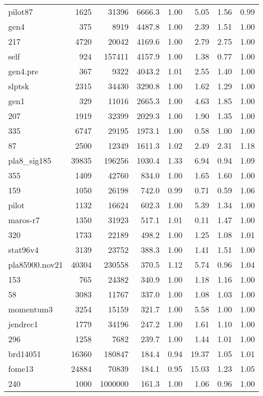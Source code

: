 \documentclass[10pt]{article}
\begin{document}
\begin{longtable}{|l|r|r|r|r|r|r|r|}
pilot87	&	1625	&	31396	&	6666.3	&	1.00	&	5.05	&	1.56	&	0.99	\\
gen4	&	375	&	8919	&	4487.8	&	1.00	&	2.39	&	1.51	&	1.00	\\
217	&	4720	&	20042	&	4169.6	&	1.00	&	2.79	&	2.75	&	1.00	\\
self	&	924	&	157411	&	4157.9	&	1.00	&	1.38	&	0.77	&	1.00	\\
gen4.pre	&	367	&	9322	&	4043.2	&	1.01	&	2.55	&	1.40	&	1.00	\\
slptsk	&	2315	&	34430	&	3290.8	&	1.00	&	1.62	&	1.29	&	1.00	\\
gen1	&	329	&	11016	&	2665.3	&	1.00	&	4.63	&	1.85	&	1.00	\\
207	&	1919	&	32399	&	2029.3	&	1.00	&	1.90	&	1.35	&	1.00	\\
335	&	6747	&	29195	&	1973.1	&	1.00	&	0.58	&	1.00	&	1.00	\\
87	&	2500	&	12349	&	1611.3	&	1.02	&	2.49	&	2.31	&	1.18	\\
pla8\_sig185	&	39835	&	196256	&	1030.4	&	1.33	&	6.94	&	0.94	&	1.09	\\
355	&	1409	&	42760	&	834.0	&	1.00	&	1.65	&	1.60	&	1.00	\\
159	&	1050	&	26198	&	742.0	&	0.99	&	0.71	&	0.59	&	1.06	\\
pilot	&	1132	&	16624	&	602.3	&	1.00	&	5.39	&	1.34	&	1.00	\\
maros-r7	&	1350	&	31923	&	517.1	&	1.01	&	0.11	&	1.47	&	1.00	\\
320	&	1733	&	22189	&	498.2	&	1.00	&	1.25	&	1.08	&	1.01	\\
stat96v4	&	3139	&	23752	&	388.3	&	1.00	&	1.41	&	1.51	&	1.00	\\
pla85900.nov21	&	40304	&	230558	&	370.5	&	1.12	&	5.74	&	0.96	&	1.04	\\
153	&	765	&	24382	&	340.9	&	1.00	&	1.18	&	1.16	&	1.00	\\
58	&	3083	&	11767	&	337.0	&	1.00	&	1.08	&	1.03	&	1.00	\\
momentum3	&	3254	&	15159	&	321.7	&	1.00	&	5.58	&	1.00	&	1.00	\\
jendrec1	&	1779	&	34196	&	247.2	&	1.00	&	1.61	&	1.10	&	1.00	\\
296	&	1258	&	7682	&	239.7	&	1.00	&	1.44	&	1.01	&	1.00	\\
brd14051	&	16360	&	180847	&	184.4	&	0.94	&	19.37	&	1.05	&	1.01	\\
fome13	&	24884	&	70839	&	184.1	&	0.95	&	15.03	&	1.23	&	1.05	\\
240	&	1000	&	1000000	&	161.3	&	1.00	&	1.06	&	0.96	&	1.00	\\

\end{longtable}
\end{document}
